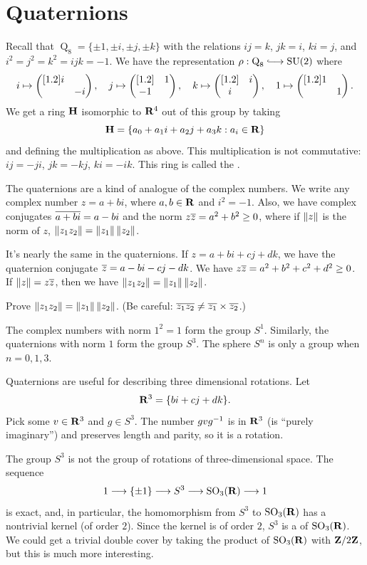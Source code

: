 \documentclass[11pt, twoside]{amsart}
\begin{document}
\section{Quaternions}
Recall that $\operatorname{Q}_8  = \{ \pm1,\pm i,\pm  j,\pm k\}$ with the relations $ij = k$, $jk=i$, $ki=j$, and $i^2 = j^2 = k^2 = ijk =-1$. We have the representation $\rho : \operatorname{Q}_8  \hookrightarrow \SU(2)$ where
\begin{align*}
i \mapsto \begin{pmatrix} [1.2] i &\\ & -i\end{pmatrix},\quad  j \mapsto \begin{pmatrix} [1.2]  & 1 \\ -1&\end{pmatrix},\quad k \mapsto \begin{pmatrix} [1.2] & i \\i&\end{pmatrix},\quad  1\mapsto \begin{pmatrix} [1.2] 1 & \\ & 1\end{pmatrix}.
\end{align*}
We get a ring $\mathbf H$ isomorphic to $\mathbf R^4$ out of this group by taking
$$
\mathbf H = \{a_0 + a_1 i + a_2j +a_3 k : a_i\in \mathbf R\}
$$
and defining the multiplication as above. This multiplication is not commutative: $ij=-ji$, $jk= -kj$, $ki = -ik$. This ring is called the . 

The quaternions are a kind of analogue of the complex numbers. We write any complex number $z = a + bi$, where $a,b\in \mathbf R$ and $i^2 = -1$. Also, we have complex conjugates $\overline{a+bi} = a-bi$ and the norm $z\overline z = a^2 + b^2\ge 0$, where if $\left \lVert z \right \rVert$ is the norm of $z$, $\left \lVert z_1z_2 \right \rVert = \left \lVert z_1 \right \rVert \left \lVert z_2 \right \rVert$. 

It's nearly the same in the quaternions. If $z= a + bi + cj +dk$, we have the quaternion conjugate $\overline z = a - bi - cj - dk$. We have $z\overline z = a^2 + b^2 +c^2 + d^2 \ge 0$. If $\left \lVert z \right \rVert = z\overline z$, then we have $\left \lVert z_1z_2 \right \rVert = \left \lVert z_1 \right \rVert\left \lVert z_2 \right \rVert$.
\begin{exercise}
Prove $\left \lVert z_1z_2 \right \rVert = \left \lVert z_1 \right \rVert\left \lVert z_2 \right \rVert$. (Be careful: $\overline {z_1z_2} \neq \overline{ z_1}\times\overline{z_2}$.)
\end{exercise}

The complex numbers with norm $1^2 = 1$ form the group $S^1$. Similarly, the quaternions with norm $1$ form the group $S^3$. The sphere $S^n$ is only a group when $n = 0,1,3$.

Quaternions are useful for describing three dimensional rotations. Let 
$$
\mathbf R^3 = \{b i + cj + dk\}.
$$
Pick some $v\in \mathbf R^3$ and $g\in S^3$. The number $gvg^{-1}$ is in $\mathbf R^3$ (is ``purely imaginary'') and preserves length and parity, so it is a rotation. 

The group $S^3$ is not the group of rotations of three-dimensional space. The sequence 
$$
1\longrightarrow\{\pm1\} \longrightarrow S^3 \longrightarrow \operatorname{SO}_3(\mathbf R)\longrightarrow 1
$$
is exact, and, in particular, the homomorphism from $S^3 $ to $\operatorname{SO}_3(\mathbf R)$ has a nontrivial kernel (of order $2$). Since the kernel is of order $2$, $S^3$ is a  of $\operatorname{SO}_3(\mathbf R)$. We could get a trivial double cover by taking the product of $\operatorname{SO}_3(\mathbf R)$ with $\mathbf{Z}/2\mathbf{Z}$, but this is much more interesting.
\end{document}
